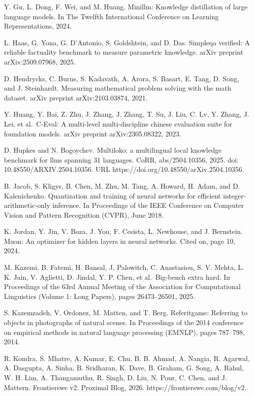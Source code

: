 \documentclass[
  10
]{article}
\begin{document}
Y. Gu, L. Dong, F. Wei, and M. Huang. Minillm: Knowledge distillation of
large language models. In The Twelfth International Conference on
Learning Representations, 2024.

L. Haas, G. Yona, G. D'Antonio, S. Goldshtein, and D. Das. Simpleqa
verified: A reliable factuality benchmark to measure parametric
knowledge. arXiv preprint arXiv:2509.07968, 2025.

D. Hendrycks, C. Burns, S. Kadavath, A. Arora, S. Basart, E. Tang, D.
Song, and J. Steinhardt. Measuring mathematical problem solving with the
math dataset. arXiv preprint arXiv:2103.03874, 2021.

Y. Huang, Y. Bai, Z. Zhu, J. Zhang, J. Zhang, T. Su, J. Liu, C. Lv, Y.
Zhang, J. Lei, et al.~C-Eval: A multi-level multi-discipline chinese
evaluation suite for foundation models. arXiv preprint arXiv:2305.08322,
2023.

D. Hupkes and N. Bogoychev. Multiloko: a multilingual local knowledge
benchmark for llms spanning 31 languages. CoRR, abs/2504.10356, 2025.
doi: 10.48550/ARXIV.2504.10356. URL
https://doi.org/10.48550/arXiv.2504.10356.

B. Jacob, S. Kligys, B. Chen, M. Zhu, M. Tang, A. Howard, H. Adam, and
D. Kalenichenko. Quantization and training of neural networks for
efficient integer-arithmetic-only inference. In Proceedings of the IEEE
Conference on Computer Vision and Pattern Recognition (CVPR), June 2018.

K. Jordan, Y. Jin, V. Boza, J. You, F. Cesista, L. Newhouse, and J.
Bernstein. Muon: An optimizer for hidden layers in neural networks.
Cited on, page 10, 2024.

M. Kazemi, B. Fatemi, H. Bansal, J. Palowitch, C. Anastasiou, S. V.
Mehta, L. K. Jain, V. Aglietti, D. Jindal, Y. P. Chen, et al.~Big-bench
extra hard. In Proceedings of the 63rd Annual Meeting of the Association
for Computational Linguistics (Volume 1: Long Papers), pages
26473--26501, 2025.

S. Kazemzadeh, V. Ordonez, M. Matten, and T. Berg. Referitgame:
Referring to objects in photographs of natural scenes. In Proceedings of
the 2014 conference on empirical methods in natural language processing
(EMNLP), pages 787--798, 2014.



R. Kondra, S. Mhatre, A. Kumar, E. Chu, B. B. Ahmad, A. Nangia, R.
Agarwal, A. Dasgupta, A. Sinha, B. Sridharan, K. Dave, B. Graham, G.
Song, A. Rahul, W. H. Lim, A. Thangamuthu, R. Singh, D. Liu, N. Pour, C.
Chen, and J. Mattern. Frontierswe v2. Proximal Blog, 2026.
https://frontierswe.com/blog/v2.
\end{document}

